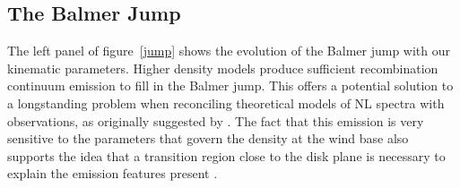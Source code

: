 \documentclass[preprint, a4paper, 11pt]{aastex}
\begin{document}
\subsection{The Balmer Jump}

\label{balmerjump}

The left panel of figure~\ref{jump} shows the evolution
of the Balmer jump with our kinematic parameters. Higher density models
produce sufficient recombination continuum emission to fill 
in the Balmer jump. This offers a potential solution to a 
longstanding problem when reconciling theoretical
models of NL spectra with observations, as originally suggested by
\cite{KLWB98}. The fact that this emission is very sensitive to the parameters
that govern the density at the wind base also supports
the idea that a transition region close to the disk plane is necessary
to explain the emission features present \citep{kd1997}.



\end{document}
